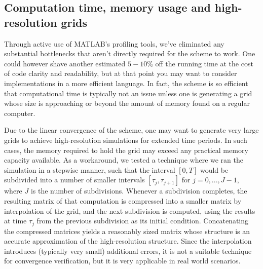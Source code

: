 \subsection*{Computation time, memory usage and high-resolution grids}
Through active use of MATLAB's profiling tools, we've eliminated any substantial bottlenecks that aren't directly required for the scheme to work. One could however shave another estimated $5-10\%$ off the running time at the cost of code clarity and readability, but at that point you may want to consider implementations in a more efficient language. In fact, the scheme is so efficient that computational time is typically not an issue unless one is generating a grid whose size is approaching or beyond the amount of memory found on a regular computer.

Due to the linear convergence of the scheme, one may want to generate very large grids to achieve high-resolution simulations for extended time periods. In such cases, the memory required to hold the grid may exceed any practical memory capacity available. As a workaround, we tested a technique where we ran the simulation in a stepwise manner, such that the interval $[0, T]$ would be subdivided into a number of smaller intervals $[\tau_j, \tau_{j+1}]$ for $j = 0, ..., J - 1$, where $J$ is the number of subdivisions. Whenever a subdivision completes, the resulting matrix of that computation is compressed into a smaller matrix by interpolation of the grid, and the next subdivision is computed, using the results at time $\tau_{j}$ from the previous subdivision as its initial condition. Concatenating the compressed matrices yields a reasonably sized matrix whose structure is an accurate approximation of the high-resolution structure. Since the interpolation introduces (typically very small) additional errors, it is not a suitable technique for convergence verification, but it is very applicable in real world scenarios.
